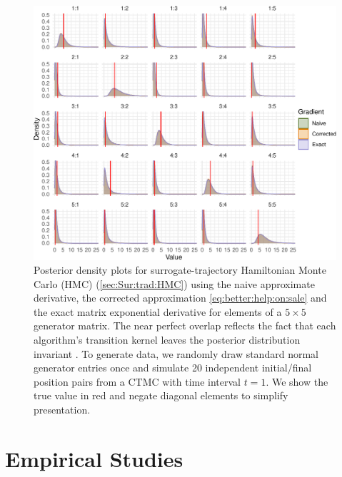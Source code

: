 \documentclass[9pt,twocolumn,twoside]{pnas-new}
\newcommand{\?}{\textbf{?}}
\begin{document}
\begin{figure}[!t]
	\centering
	\includegraphics[width=\linewidth]{lowDimVis.pdf}
	\vspace{-2em}
	\caption{Posterior density plots for surrogate-trajectory Hamiltonian Monte Carlo (HMC) (\cref{sec:Sur:trad:HMC}) using the naive approximate derivative, the corrected approximation \eqref{eq:better:help:on:sale} and the exact matrix exponential derivative for elements of a $5\times 5$ generator matrix. The near perfect overlap reflects the fact that each algorithm's transition kernel leaves the posterior distribution invariant \cite{glatt2020accept}.  To generate data, we randomly draw standard normal generator entries once and simulate 20 independent initial/final position pairs from a CTMC with time interval $t=1$.  We show the true value in red and negate diagonal elements to simplify presentation.  }\label{fig:lowDim}
\end{figure}

\section{Empirical Studies}\label{sec:emp}
\end{document}
